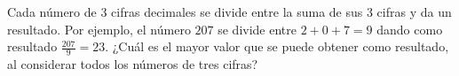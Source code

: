 Cada número de $3$ cifras decimales se divide entre la suma de sus $3$ cifras y da un resultado. Por ejemplo, el número $207$ se divide entre $2+0+7=9$ dando como resultado $\frac{207}{9}=23$. ¿Cuál es el mayor valor que se puede obtener como resultado, al considerar todos los números de tres cifras?